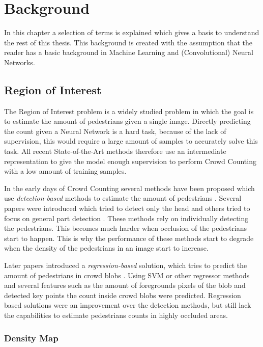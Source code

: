 \chapter{Background}
In this chapter a selection of terms is explained which gives a basis to understand the rest of this thesis. This background is created with the assumption that the reader has a basic background in Machine Learning and (Convolutional) Neural Networks.


\section{Region of Interest}
The Region of Interest problem is a widely studied problem in which the goal is to estimate the amount of pedestrians given a single image. Directly predicting the count given a Neural Network is a hard task, because of the lack of supervision, this would require a large amount of samples to accurately solve this task. All recent State-of-the-Art methods therefore use an intermediate representation to give the model enough supervision to perform Crowd Counting with a low amount of training samples.

In the early days of Crowd Counting several methods have been proposed which use \emph{detection-based} methods to estimate the amount of pedestrians \cite{Dalal2005, Dollar2012} . Several papers were introduced which tried to detect only the head \cite{Subburaman2012} and others tried to focus on general part detection \cite{Wu2007, Lin2010}. These methods rely on individually detecting the pedestrians. This becomes much harder when occlusion of the pedestrians start to happen. This is why the performance of these methods start to degrade when the density of the pedestrians in an image start to increase.

Later papers introduced a \emph{regression-based} solution, which tries to predict the amount of pedestrians in crowd blobs \cite{Chan2009, Idrees2013, zheng_cross-line_2019}. Using SVM or other regressor methods and several features such as the amount of foregrounds pixels of the blob and detected key points the count inside crowd blobs were predicted. Regression based solutions were an improvement over the detection methods, but still lack the capabilities to estimate pedestrians counts in highly occluded areas.

\subsection{Density Map}

